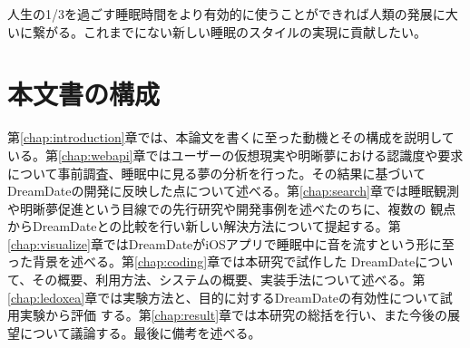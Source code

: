 人生の1/3を過ごす睡眠時間をより有効的に使うことができれば人類の発展に大いに繋がる。これまでにない新しい睡眠のスタイルの実現に貢献したい。

\section{本文書の構成}
第\ref{chap:introduction}章では、本論文を書くに至った動機とその構成を説明している。第\ref{chap:webapi}章ではユーザーの仮想現実や明晰夢における認識度や要求について事前調査、睡眠中に見る夢の分析を行った。その結果に基づいてDreamDateの開発に反映した点について述べる。第\ref{chap:search}章では睡眠観測や明晰夢促進という目線での先行研究や開発事例を述べたのちに、複数の 観点からDreamDateとの比較を行い新しい解決方法について提起する。第\ref{chap:visualize}章ではDreamDateがiOSアプリで睡眠中に音を流すという形に至った背景を述べる。第\ref{chap:coding}章では本研究で試作した DreamDateについて、その概要、利用方法、システムの概要、実装手法について述べる。第\ref{chap:ledoxea}章では実験方法と、目的に対するDreamDateの有効性について試用実験から評価 する。第\ref{chap:result}章では本研究の総括を行い、また今後の展望について議論する。最後に備考を述べる。
